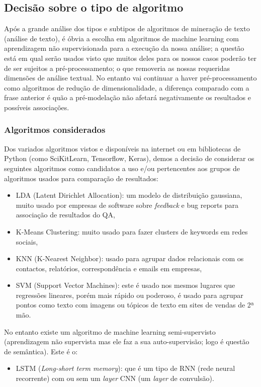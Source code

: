 \documentclass[a4paper,10pt]{article}
\begin{document}
\subsection{Decisão sobre o tipo de algoritmo}

Após a grande análise dos tipos e subtipos de algoritmos de mineração de texto (análise de texto), é óbvia a escolha em algoritmos de machine learning com aprendizagem não supervisionada para a execução da nossa análise; a questão está em qual serão usados visto que muitos deles para os nossos casos poderão ter de ser sujeitos a pré-processamento; o que removeria as nossas requeridas dimensões de análise textual.
No entanto vai continuar a haver pré-processamento como algoritmos de redução de dimensionalidade, a diferença comparado com a frase anterior é quão a pré-modelação não afetará negativamente os resultados e possíveis associações.

\subsubsection{Algoritmos considerados}

Dos variados algoritmos vistos e disponíveis na internet ou em bibliotecas de Python (como SciKitLearn, Tensorflow, Keras), demos a decisão de considerar os seguintes algoritmos como candidatos a uso e/ou pertencentes aos grupos de algoritmos usados para comparação de resultados:
\begin{itemize}
    \item LDA (Latent Dirichlet Allocation): um modelo de distribuição gaussiana, muito usado por empresas de software sobre \textit{feedback} e bug reports para associação de resultados do QA,
    \item K-Means Clustering: muito usado para fazer clusters de keywords em redes sociais,
    \item KNN (K-Nearest Neighbor): usado para agrupar dados relacionais com os contactos, relatórios, correspondência e emails em empresas,
    \item SVM (Support Vector Machines): este é usado nos mesmos lugares que regressões lineares, porém mais rápido ou poderoso, é usado para agrupar pontos como texto com imagens ou tópicos de texto em sites de vendas de 2ª mão.
\end{itemize}

No entanto existe um algoritmo de machine learning semi-supervisto (aprendizagem não supervista mas ele faz a sua auto-supervisão; logo é questão de semântica).
Este é o:
\begin{itemize}
  \item LSTM (\textit{Long-short term memory}): que é um tipo de RNN (rede neural recorrente) com ou sem um \textit{layer} CNN (um \textit{layer} de convulsão).
\end{itemize}
\end{document}
